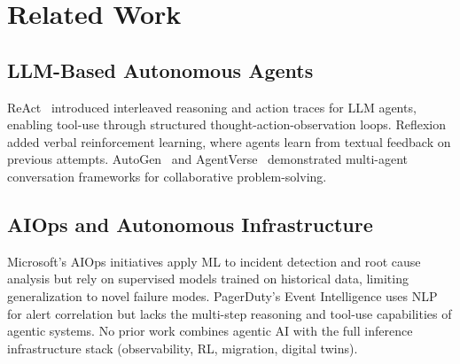 \documentclass[conference,10pt,letterpaper]{IEEEtran}
\begin{document}
\begin{table}[!t]
\caption{AgentInfer Integration Points with Papers 1--8}
\label{tab:integration}
\centering\scriptsize
{}
\end{table}


\section{Related Work}
\label{sec:related}

\subsection{LLM-Based Autonomous Agents}

ReAct~\cite{yao2023react} introduced interleaved reasoning and action traces for LLM agents, enabling tool-use through structured thought-action-observation loops. Reflexion~\cite{shinn2023reflexion} added verbal reinforcement learning, where agents learn from textual feedback on previous attempts. AutoGen~\cite{wu2023autogen} and AgentVerse~\cite{chen2024agentverse} demonstrated multi-agent conversation frameworks for collaborative problem-solving.

\subsection{AIOps and Autonomous Infrastructure}

Microsoft's AIOps initiatives apply ML to incident detection and root cause analysis but rely on supervised models trained on historical data, limiting generalization to novel failure modes. PagerDuty's Event Intelligence uses NLP for alert correlation but lacks the multi-step reasoning and tool-use capabilities of agentic systems. No prior work combines agentic AI with the full inference infrastructure stack (observability, RL, migration, digital twins).
\end{document}

